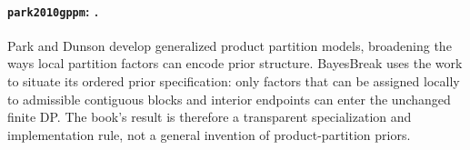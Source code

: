 
\paragraph{\texttt{park2010gppm}: \citet{park2010gppm}.}
Park and Dunson develop generalized product partition models, broadening the ways local partition factors can encode prior structure. BayesBreak uses the work to situate its ordered prior specification: only factors that can be assigned locally to admissible contiguous blocks and interior endpoints can enter the unchanged finite DP. The book's result is therefore a transparent specialization and implementation rule, not a general invention of product-partition priors.
